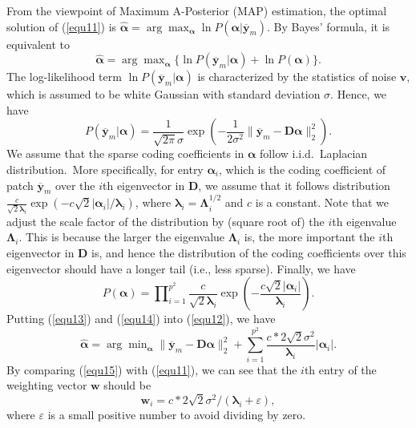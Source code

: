 From the viewpoint of Maximum A-Posterior (MAP) estimation, the optimal solution of (\ref{equ11}) is $\hat{\bm{\alpha}} = \arg\max\nolimits_{\bm{\alpha}}\ln P(\bm{\alpha}|\bm{\overline{y}}_{m})$. By Bayes' formula, it is equivalent to
\begin{equation}\label{equ12}
\hat{\bm{\alpha}} = \arg\max\nolimits_{\bm{\alpha}}\{\ln P(\bm{\overline{y}}_{m}|\bm{\alpha})+\ln P(\bm{\alpha})\}.
\end{equation}
The log-likelihood term $\ln P(\bm{\overline{y}}_{m}|\bm{\alpha})$ is characterized by the statistics of noise $\bm{v}$, which is assumed to be white Gaussian with standard deviation $\sigma$. Hence, we have
\begin{equation}\label{equ13}
P(\bm{\overline{y}}_{m}|\bm{\alpha}) = \frac{1}{\sqrt{2\pi}\sigma}\exp(-\frac{1}{2\sigma^{2}}\|\bm{\overline{y}}_{m}-\bm{D}\bm{\alpha}\|_{2}^{2}).
\end{equation}
We assume that the sparse coding coefficients in $\bm{\alpha}$ follow i.i.d.\ Laplacian distribution.\ More specifically, for entry $\bm{\alpha}_{i}$, which is the coding coefficient of patch $\bm{\overline{y}}_{m}$ over the $i$th eigenvector in $\bm{D}$, we assume that it follows distribution $\frac{c}{\sqrt{2}\bm{\lambda}_{i}}\exp(-c\sqrt{2}|\bm{\alpha}_{i}|/\bm{\lambda}_{i})$, where $\bm{\lambda}_{i}=\bm{\Lambda}_{i}^{1/2}$ and $c$ is a constant. Note that we adjust the scale factor of the distribution by (square root of) the $i$th eigenvalue $\bm{\Lambda}_{i}$. This is because the larger the eigenvalue $\bm{\Lambda}_{i}$ is, the more important the $i$th eigenvector in $\bm{D}$ is, and hence the distribution of the coding coefficients over this eigenvector should have a longer tail (i.e., less sparse). Finally, we have
\begin{equation}\label{equ14}
P(\bm{\alpha})=\prod\nolimits_{i=1}^{p^{2}}\frac{c}{\sqrt{2}\bm{\lambda}_{i}}\exp(-\frac{c\sqrt{2}|\bm{\alpha}_{i}|}{\bm{\lambda}_{i}}).
\end{equation}
Putting (\ref{equ13}) and (\ref{equ14}) into (\ref{equ12}), we have
\begin{equation}\label{equ15}
\hat{\bm{\alpha}}=\arg\min\nolimits_{\bm{\alpha}}\|\bm{\overline{y}}_{m}-\bm{D}\bm{\alpha}\|_{2}^{2}+\sum_{i=1}^{p^{2}}\frac{c*2\sqrt{2}\sigma^{2}}{\bm{\lambda}_{i}}|\bm{\alpha}_{i}|.
\end{equation}
By comparing (\ref{equ15}) with (\ref{equ11}), we can see that the $i$th entry of the weighting vector $\bm{w}$ should be
\begin{equation}\label{equ16}
\bm{w}_{i} = c*2\sqrt{2}\sigma^{2}/(\bm{\lambda}_{i}+\varepsilon),
\end{equation}
where $\varepsilon$ is a small positive number to avoid dividing by zero.

